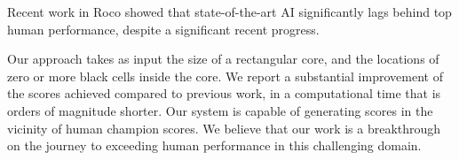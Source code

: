 Recent work in {\sc Roco} showed that state-of-the-art AI significantly lags behind
top human performance, despite a significant recent progress.

Our approach takes as input the size of a rectangular core,
and the locations of zero or more black cells inside the core.
We report a substantial improvement of the scores achieved compared
to previous work, in a computational time that is orders of magnitude shorter.
Our system is capable of generating scores in the vicinity of human champion scores.
We believe that our work is a breakthrough on the journey to exceeding
human performance in this challenging domain.


